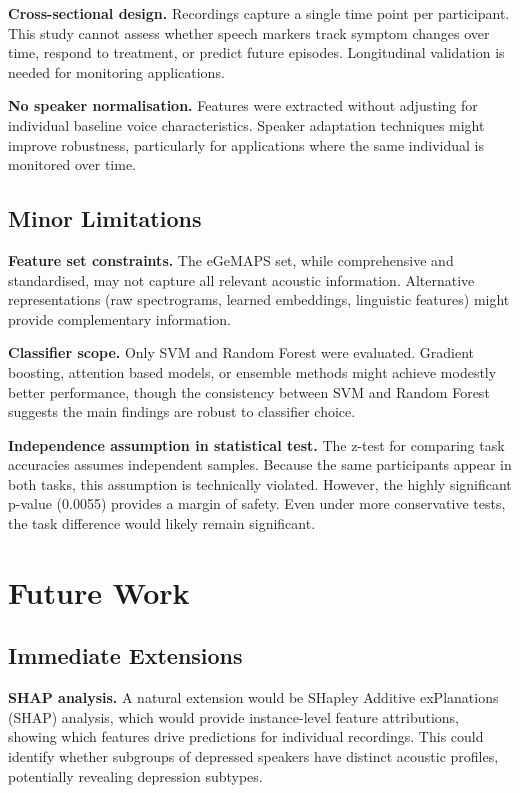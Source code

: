 \textbf{Cross-sectional design.} Recordings capture a single time point per participant. This study cannot assess whether speech markers track symptom changes over time, respond to treatment, or predict future episodes. Longitudinal validation is needed for monitoring applications.

\textbf{No speaker normalisation.} Features were extracted without adjusting for individual baseline voice characteristics. Speaker adaptation techniques might improve robustness, particularly for applications where the same individual is monitored over time.

\subsection{Minor Limitations}

\textbf{Feature set constraints.} The eGeMAPS set, while comprehensive and standardised, may not capture all relevant acoustic information. Alternative representations (raw spectrograms, learned embeddings, linguistic features) might provide complementary information.

\textbf{Classifier scope.} Only SVM and Random Forest were evaluated. Gradient boosting, attention based models, or ensemble methods might achieve modestly better performance, though the consistency between SVM and Random Forest suggests the main findings are robust to classifier choice.

\textbf{Independence assumption in statistical test.} The z-test for comparing task accuracies assumes independent samples. Because the same participants appear in both tasks, this assumption is technically violated. However, the highly significant p-value (0.0055) provides a margin of safety. Even under more conservative tests, the task difference would likely remain significant.

\section{Future Work}

\subsection{Immediate Extensions}

\textbf{SHAP analysis.} A natural extension would be SHapley Additive exPlanations (SHAP) analysis, which would provide instance-level feature attributions, showing which features drive predictions for individual recordings. This could identify whether subgroups of depressed speakers have distinct acoustic profiles, potentially revealing depression subtypes.

